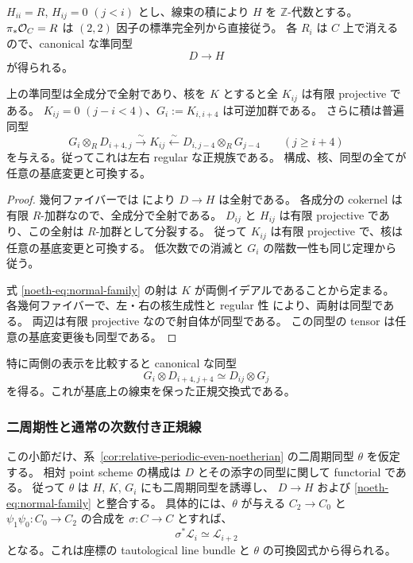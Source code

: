 $H_{ii}=R$, $H_{ij}=0$ $(j<i)$ とし、線束の積により $H$ を $\mathbb Z$-代数とする。
$\pi_*\mathcal O_C=R$ は $(2,2)$ 因子の標準完全列から直接従う。
各 $R_i$ は $C$ 上で消えるので、canonical な準同型
\[
 D\longrightarrow H
\]
が得られる。

\begin{proposition}\label{noeth-prop:normal-family}
上の準同型は全成分で全射であり、核を $K$ とすると全 $K_{ij}$ は有限 projective である。
$K_{ij}=0$ $(j-i<4)$、$G_i:=K_{i,i+4}$ は可逆加群である。
さらに積は普遍同型
\begin{equation}\label{noeth-eq:normal-family}
 G_i\otimes_R D_{i+4,j}\xrightarrow{\sim}K_{ij}
 \xleftarrow{\sim}D_{i,j-4}\otimes_R G_{j-4}
 \qquad(j\ge i+4)
\end{equation}
を与える。従ってこれは左右 regular な正規族である。
構成、核、同型の全てが任意の基底変更と可換する。
\end{proposition}

\begin{proof}
幾何ファイバーでは \cite[Theorem 5.5.6(1)]{VdB2011} により $D\to H$ は全射である。
各成分の cokernel は有限 $R$-加群なので、全成分で全射である。
$D_{ij}$ と $H_{ij}$ は有限 projective であり、この全射は $R$-加群として分裂する。
従って $K_{ij}$ は有限 projective で、核は任意の基底変更と可換する。
低次数での消滅と $G_i$ の階数一性も同じ定理から従う。

式 \eqref{noeth-eq:normal-family} の射は $K$ が両側イデアルであることから定まる。
各幾何ファイバーで、左・右の核生成性と regular 性
\cite[Theorem 5.5.6(1),(3)]{VdB2011} により、両射は同型である。
両辺は有限 projective なので射自体が同型である。
この同型の tensor は任意の基底変更後も同型である。
\end{proof}

特に両側の表示を比較すると canonical な同型
\begin{equation}\label{noeth-eq:normal-commutation}
 G_i\otimes D_{i+4,j+4}\simeq D_{ij}\otimes G_j
\end{equation}
を得る。これが基底上の線束を保った正規交換式である。

\subsubsection{二周期性と通常の次数付き正規線}

この小節だけ、系~\ref{cor:relative-periodic-even-noetherian} の二周期同型 $\theta$ を仮定する。
相対 point scheme の構成は $D$ とその添字の同型に関して functorial である。
従って $\theta$ は $H$, $K$, $G_i$ にも二周期同型を誘導し、
$D\to H$ および \eqref{noeth-eq:normal-family} と整合する。
具体的には、$\theta$ が与える $C_2\to C_0$ と
$\psi_1\psi_0:C_0\to C_2$ の合成を $\sigma:C\to C$ とすれば、
\[
 \sigma^*\mathcal L_i\simeq\mathcal L_{i+2}
\]
となる。これは座標の tautological line bundle と $\theta$ の可換図式から得られる。

